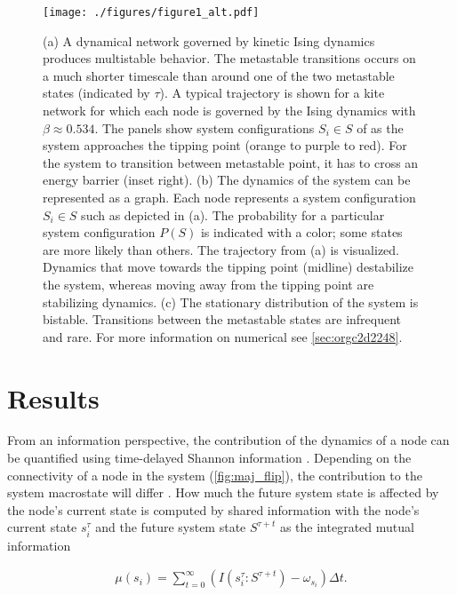 \documentclass[a4paper, 11pt, twocolumn]{article}
\begin{document}
\begin{figure}
\centering
\texttt{[image: ./figures/figure1\_alt.pdf]}
\caption{\label{fig:introduction}(a) A dynamical network governed by kinetic Ising dynamics produces multistable behavior. The metastable transitions occurs on a much shorter timescale than around one of the two metastable states (indicated by \(\tau\)). A typical trajectory is shown for a kite network for which each node is governed by the Ising dynamics with \(\beta \approx 0.534\). The panels show system configurations \(S_i \in S\) of as the system approaches the tipping point (orange to purple to red). For the system to transition between metastable point, it has to cross an energy barrier (inset right). (b) The dynamics of the system can be represented as a graph. Each node represents a system configuration \(S_i \in S\) such as depicted in (a). The probability for a particular system configuration \(P(S)\) is indicated with a color; some states are more likely than others. The trajectory from (a) is visualized. Dynamics that move towards the tipping point (midline) destabilize the system, whereas moving away from the tipping point are stabilizing dynamics. (c) The stationary distribution of the system is bistable. Transitions between the metastable states are infrequent and rare. For more information on numerical see \ref{sec:orgc2d2248}.}
\end{figure}

\section{Results}
\label{sec:org6f0b033}
From  an information  perspective, the  contribution of  the
dynamics  of a  node  can be  quantified using  time-delayed
Shannon   information  \cite{Cover2005}.   Depending  on   the
connectivity of a node  in the system (\cref{fig:maj_flip}),
the  contribution  to  the  system  macrostate  will  differ
\cite{vanElteren2022,Quax2013}.  How  much the  future  system
state is affected by the node's current state is computed by
shared information with the node's current state \(s_i^{\tau}\) and
the  future system  state \(S^{\tau + t}\)  as the  integrated mutual
information

\begin{equation}
\label{eq:adj_imi}
\begin{split}
\mu(s_i) = \sum_{t = 0}^\infty (I(s_i^{\tau} : S^{\tau + t}) - \omega_{s_i}) \Delta t.
\end{split}
\end{equation}
\end{document}
